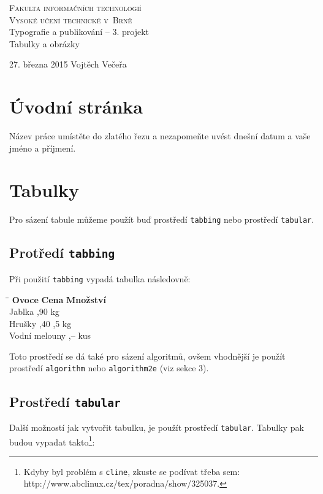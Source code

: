 \documentclass[11pt,a4paper,onecolumn]{article}
\begin{document}
\begin{titlepage}
  \begin{center}

    \textsc{\Huge Fakulta informačních technologií\\Vysoké učení technické v~Brně}\\
    \LARGE Typografie a publikování -- 3. projekt\\
    Tabulky a obrázky\\
  \end{center}
  {\Large 27. března 2015 \hfill Vojtěch Večeřa}
\end{titlepage}

\section{Úvodní stránka}
\label{uvod}
\noindent Název práce umístěte do zlatého řezu a nezapomeňte uvést dnešní datum a vaše jméno a příjmení.
\section{Tabulky}
\label{tabulky}
\noindent Pro sázení tabule můžeme použít buď prostředí \texttt{tabbing} nebo prostředí \texttt{tabular}.
\subsection{Protředí \texttt{tabbing}}
\noindent Při použití \texttt{tabbing} vypadá tabulka následovně:
\begin{tabbing}
\pushtabs \qquad\qquad\qquad\qquad \= \qquad\qquad \= \qquad\qquad \kill
\textbf{Ovoce} \> \textbf{Cena} \> \textbf{Množství} \\
Jablka ,90  kg \\
Hrušky ,40 ,5 kg \\
Vodní melouny ,--  kus \\
\poptabs
\end{tabbing}
\noindent Toto prostředí se dá také pro sázení algoritmů, ovšem vhodnější je použít prostředí \texttt{algorithm} nebo \texttt{algorithm2e} (viz sekce 3).
\subsection{Prostředí \texttt{tabular}}
\noindent Další možností jak vytvořit tabulku, je použít prostředí \texttt{tabular}. Tabulky pak budou vypadat takto\footnote{Kdyby byl problém s \texttt{cline}, zkuste se podívat třeba sem: http://www.abclinux.cz/tex/poradna/show/325037.}:
\end{document}
